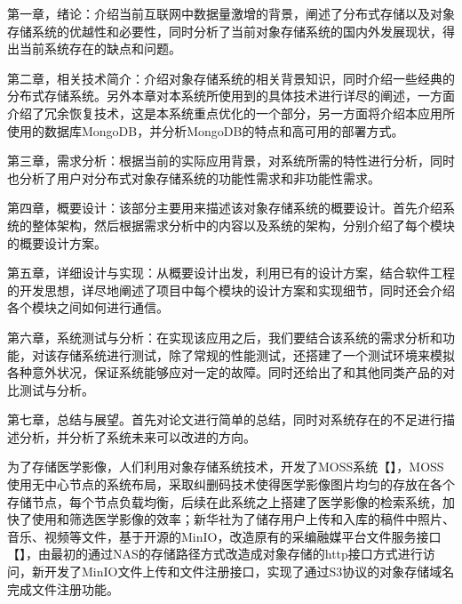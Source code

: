 第一章，绪论：介绍当前互联网中数据量激增的背景，阐述了分布式存储以及对象存储系统的优越性和必要性，同时分析了当前对象存储系统的国内外发展现状，得出当前系统存在的缺点和问题。

第二章，相关技术简介：介绍对象存储系统的相关背景知识，同时介绍一些经典的分布式存储系统。另外本章对本系统所使用到的具体技术进行详尽的阐述，一方面介绍了冗余恢复技术，这是本系统重点优化的一个部分，另一方面将介绍本应用所使用的数据库MongoDB，并分析MongoDB的特点和高可用的部署方式。 

第三章，需求分析：根据当前的实际应用背景，对系统所需的特性进行分析，同时也分析了用户对分布式对象存储系统的功能性需求和非功能性需求。

第四章，概要设计：该部分主要用来描述该对象存储系统的概要设计。首先介绍系统的整体架构，然后根据需求分析中的内容以及系统的架构，分别介绍了每个模块的概要设计方案。

第五章，详细设计与实现：从概要设计出发，利用已有的设计方案，结合软件工程的开发思想，详尽地阐述了项目中每个模块的设计方案和实现细节，同时还会介绍各个模块之间如何进行通信。

第六章，系统测试与分析：在实现该应用之后，我们要结合该系统的需求分析和功能，对该存储系统进行测试，除了常规的性能测试，还搭建了一个测试环境来模拟各种意外状况，保证系统能够应对一定的故障。同时还给出了和其他同类产品的对比测试与分析。

第七章，总结与展望。首先对论文进行简单的总结，同时对系统存在的不足进行描述分析，并分析了系统未来可以改进的方向。

为了存储医学影像，人们利用对象存储系统技术，开发了MOSS系统【】，MOSS使用无中心节点的系统布局，采取纠删码技术使得医学影像图片均匀的存放在各个存储节点，每个节点负载均衡，后续在此系统之上搭建了医学影像的检索系统，加快了使用和筛选医学影像的效率；新华社为了储存用户上传和入库的稿件中照片、音乐、视频等文件，基于开源的MinIO，改造原有的采编融媒平台文件服务接口【】，由最初的通过NAS的存储路径方式改造成对象存储的http接口方式进行访问，新开发了MinIO文件上传和文件注册接口，实现了通过S3协议的对象存储域名完成文件注册功能。